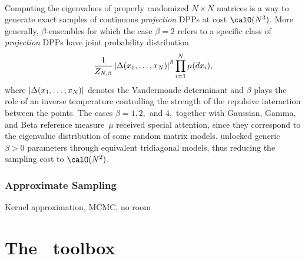 \documentclass[twoside,11pt]{article}
\begin{document}
      \\
      Computing the eigenvalues of properly randomized $N\times N$ matrices is a way to generate exact samples of continuous \textit{projection} DPPs at cost $\calO(N^3)$.
      More generally, $\beta$-ensembles for which the case $\beta=2$ refers to a specific class of \textit{projection} DPPs \citep{Kon05} have joint probability distribution
      \begin{equation}
        \frac{1}{Z_{N,\beta}}
        \left| \Delta(x_1,\dots,x_N) \right|^{\beta}
        \prod_{i= 1}^N
          \mu(d x_i),
      \end{equation}
      where $\left| \Delta(x_1,\dots,x_N) \right|$ denotes the Vandermonde determinant and $\beta$ plays the role of an inverse temperature controlling the strength of the repulsive interaction between the points.
      The cases $\beta=1, 2,$ and $4,$ together with Gaussian, Gamma, and Beta reference measure~$\mu$ received special attention, since they correspond to the eigenvalue distribution of some random matrix models.
      \citet{DuEd02} unlocked generic $\beta>0$ parameters through equivalent tridiagonal models, thus reducing the sampling cost to $\calO(N^2)$.


    \subsubsection{Approximate Sampling} %
    \label{ssub:approximate_sampling}

      Kernel approximation, MCMC, no room




\section{The \DPPy\ toolbox} %
\label{sec:the_dppy_toolbox}
\end{document}
